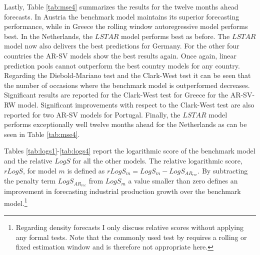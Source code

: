 \documentclass[12pt,letterpaper,fleqn]{article}           %
\begin{document}
Lastly, Table \ref{tab:mse4} summarizes the results for the twelve months ahead forecasts. In Austria the benchmark model maintains its superior forecasting performance, while in Greece the rolling window autoregressive model performs best. In the Netherlands, the $LSTAR$ model performs best as before. The $LSTAR$ model now also delivers the best predictions for Germany. For the other four countries the AR-SV models show the best results again. Once again, linear prediction pools cannot outperform the best country models for any country. Regarding the Diebold-Mariano test and the Clark-West test it can be seen that the number of occasions where the benchmark model is outperformed decreases. Significant results are reported for the Clark-West test for Greece for the AR-SV-RW model. Significant improvements with respect to the Clark-West test are also reported for two AR-SV models for Portugal. Finally, the $LSTAR$ model performs exceptionally well twelve months ahead for the Netherlands as can be seen in Table \ref{tab:mse4}.

Tables \ref{tab:logs1}-\ref{tab:logs4} report the logarithmic score of the benchmark model and the relative $LogS$ for all the other models. The relative logarithmic score, $rLogS$, for model $m$ is defined as $rLogS_m = LogS_m - LogS_{AR_{rec}}$. By subtracting the penalty term $LogS_{AR_{rec}}$ from $LogS_m$ a value smaller than zero defines an improvement in forecasting industrial production growth over the benchmark model.\footnote{Regarding density forecasts I only discuss relative scores without applying any formal tests. Note that the commonly used test by \textcite{amisano07} requires a rolling or fixed estimation window and is therefore not appropriate here.} 
\end{document}
